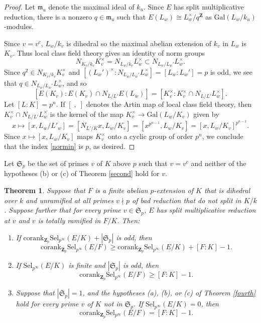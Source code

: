 \documentclass[reqno]{amsart}
\newtheorem{thm}{Theorem}[section]
\theoremstyle{definition}
\def\Z{\mathbf{Z}}
\def\Zp{\Z_p}
\def\m{\mathfrak{m}}
\def\Gal{\mathrm{Gal}}
\def\cork{\mathrm{corank}}
\def\Sel{\mathrm{Sel}}
\def\k{k}
\def\Sbad{\mathfrak{S}}
\def\spair#1#2{[#1,#2]}
\begin{document}
\begin{proof}
Let $\m_{u}$ denote the maximal ideal of $\k_u$.
Since $E$ has split multiplicative reduction, there is a nonzero $q \in \m_{u}$ 
such that $E(L_w) \cong L_w^\times / q^\Z$ as $\Gal(L_w/\k_u)$-modules.  

Since $v = v^c$, $L_w/\k_v$ is dihedral so the maximal 
abelian extension of $\k_v$ in $L_w$ is $K_v$.  
Thus local class field theory gives an identity of norm groups
$$
N_{K_v/\k_v}K_v^\times = N_{L_w/\k_v}L_w^\times 
    \subset N_{L_w/L_w'}L_w^\times.
$$
Since $q^2 \in N_{K_v/\k_v}K_v^\times$ and 
$[(L_w')^\times:N_{L_w/L_w'}L_w^\times] = [L_w:L_w'] =p$ is odd, 
we see that $q \in N_{L_w/L_w'}L_w^\times$, and so
\begin{equation}
\label{normin}
[E(K_v) : E(K_v) \cap N_{L/L'}E(L_w)] 
    = [K_v^\times : K_v^\times \cap N_{L/L'} L_w^\times].
\end{equation}
Let $[L:K] = p^n$.  
If $\spair{\;}{\;}$ denotes the Artin map of local class field theory, 
then $K_v^\times \cap N_{L/L'} L_w^\times$ is the kernel of the 
map $K_v^\times \to \Gal(L_w/K_v)$ given by 
$$
x \mapsto [x,L_w/L'_w] = [N_{L'/K}x,L_w/K_v] = [x^{p^{n-1}},L_w/K_v] 
    = [x,L_w/K_v]^{p^{n-1}}.
$$
Since $x \mapsto [x,L_w/K_v]$ maps $K_v^\times$ onto a cyclic group of 
order $p^n$, we conclude that the index \eqref{normin} is $p$, as desired.
\end{proof}

Let $\Sbad_p$ be the set of primes $v$ of $K$ above $p$ such that $v = v^c$ and  
neither of the hypotheses (b) or (c) of Theorem \ref{second} hold for $v$.

\begin{thm}
\label{smult}
Suppose that $F$ is a finite abelian $p$-extension of $K$ that is dihedral over $\k$ 
and unramified at all primes $v \nmid p$ of bad reduction that do not split in 
$K/\k$.  Suppose further that for every prime $v \in \Sbad_p$, 
$E$ has split multiplicative reduction at $v$ and $v$ is totally ramified in $F/K$.  
Then:
\begin{enumerate}
\item
If $\cork_{\Zp}\Sel_{p^\infty}(E/K) + |\Sbad_p|$ is odd, then 
$$
\cork_{\Zp}\Sel_{p^\infty}(E/F) \ge \cork_{\Zp}\Sel_{p^\infty}(E/K) + [F:K] - 1.
$$
\item
If $\Sel_{p^\infty}(E/K)$ is finite and $|\Sbad_p|$ is odd, then 
$$
\cork_{\Zp}\Sel_{p^\infty}(E/F) \ge [F:K] - 1.
$$
\item
Suppose that $|\Sbad_p| = 1$, and the hypotheses (a), (b), or (c) 
of Theorem \ref{fourth} hold for every prime $v$ of $K$ not in $\Sbad_p$. 
If $\Sel_{p^\infty}(E/K) = 0$, then 
$$
\cork_{\Zp}\Sel_{p^\infty}(E/F) = [F:K] - 1.
$$
\end{enumerate}
\end{thm}
\end{document}
